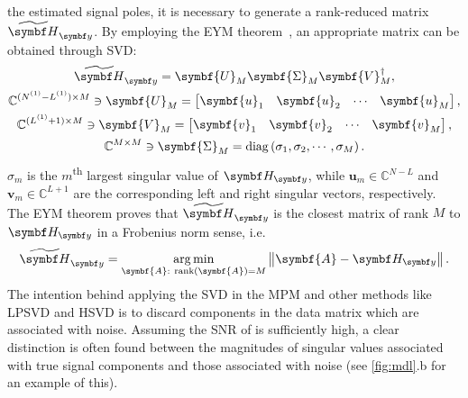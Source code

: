the estimated signal poles, it is necessary to
generate a rank-reduced matrix $\Hytilde$. By employing the \ac{EYM}
theorem~\cite[Section~2.2]{Golub2013}, an appropriate matrix can be obtained
through \ac{SVD}:%
\begin{subequations}%
    \begin{gather}%
    \Hytilde =
        \symbf{U}_M^{\vphantom{\dagger}}
        \symbf{\Sigma}_M^{\vphantom{\dagger}}
        \symbf{V}_M^{\dagger},\\
    \mathbb{C}^{(\None - \Lone) \times M} \ni
        \symbf{U}_M^{\vphantom{\dagger}} =
        \begin{bmatrix}
            \symbf{u}_1 &
            \symbf{u}_2 &
            \cdots &
            \symbf{u}_M
        \end{bmatrix},\\
    \mathbb{C}^{(\Lone + 1) \times M} \ni
        \symbf{V}_M^{\vphantom{\dagger}} =
        \begin{bmatrix}
            \symbf{v}_1 &
            \symbf{v}_2 &
            \cdots &
            \symbf{v}_M
        \end{bmatrix},\\
    \mathbb{C}^{M \times M} \ni
        \symbf{\Sigma}_M^{\vphantom{\dagger}} =
        \diag \left( \sigma_1, \sigma_2, \cdots, \sigma_M \right).
    \end{gather}
\end{subequations}
$\sigma_m$ is the $m$\textsuperscript{th} largest singular value of $\Hy$,
while $\symbf{u}_m \in \mathbb{C}^{N - L}$ and $\symbf{v}_m \in
\mathbb{C}^{L+1}$ are the corresponding left and right singular vectors,
respectively. The \ac{EYM} theorem proves that $\Hytilde$ is the closest matrix
of rank $M$ to $\Hy$ in a Frobenius norm sense, i.e.
\begin{equation}
    \Hytilde = \argmin_{\symbf{A}:\ \rank(\symbf{A}) = M} \left \lVert \symbf{A} - \Hy \right \rVert.
\end{equation}
The intention behind applying the \ac{SVD} in the \ac{MPM} and other
methods like \ac{LPSVD} and \ac{HSVD} is to discard components in the data
matrix which are associated with noise. Assuming the \ac{SNR} of  is
sufficiently high, a clear distinction is often found between the magnitudes of
singular values associated with true signal components and those associated
with noise (see \cref{fig:mdl}.b for an example of this).

